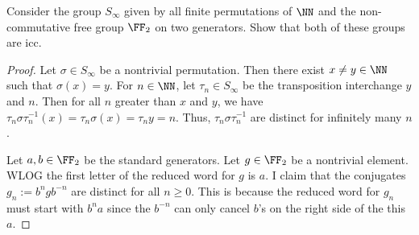 \documentclass{article}
\begin{document}
 Consider the group $S_\infty$ given by all finite permutations of $\NN$ and the non-commutative free group $\FF_2$ on two generators. Show that both of these groups are icc.
\begin{proof}
  Let $\sigma \in S_\infty$ be a nontrivial permutation.  Then there exist $x \neq y \in \NN$ such that $\sigma(x) = y$.  For $n \in \NN$, let $\tau_n \in S_\infty$ be the transposition interchange $y$ and $n$.  Then for all $n$ greater than $x$ and $y$, we have $\tau_n \sigma \tau_n^{-1} (x) = \tau_n \sigma(x) = \tau_n y = n$.  Thus, $\tau_n \sigma \tau_n^{-1}$ are distinct for infinitely many $n$.

  Let $a,b \in \FF_2$ be the standard generators.  Let $g \in \FF_2$ be a nontrivial element. WLOG the first letter of the reduced word for $g$ is $a$.  I claim that the conjugates $g_n := b^n g b^{-n}$ are distinct for all $n \ge 0$.  This is because the reduced word for $g_n$ must start with $b^n a$ since the $b^{-n}$ can only cancel $b$'s on the right side of the this $a$.
\end{proof}
\end{document}
